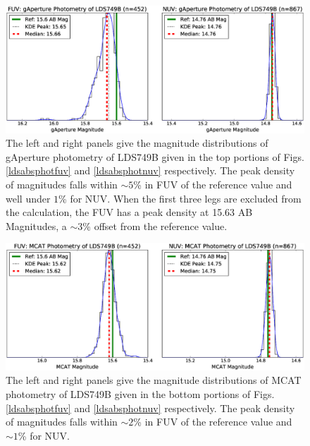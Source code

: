 \documentclass[preprint]{aastex}
\begin{document}
\begin{figure}
\includegraphics[scale=0.55]{Fig09.eps}
\caption{The left and right panels give the magnitude distributions of gAperture photometry of LDS749B given in the top portions of Figs. \ref{ldsabsphotfuv} and \ref{ldsabsphotnuv} respectively. The peak density of magnitudes falls within $\sim 5$\% in FUV of the reference value and well under $1$\% for NUV. When the first three legs are excluded from the calculation, the FUV has a peak density at 15.63 AB Magnitudes, a $\sim 3$\% offset from the reference value.
\label{magdist}}
\end{figure}


\begin{figure}
\includegraphics[scale=0.50]{Fig10.eps}
\caption{The left and right panels give the magnitude distributions of MCAT photometry of LDS749B given in the bottom portions of Figs. \ref{ldsabsphotfuv} and \ref{ldsabsphotnuv} respectively. The peak density of magnitudes falls within $\sim 2$\% in FUV of the reference value and $\sim 1$\% for NUV.
\label{magdistmcat}}
\end{figure}
\end{document}
